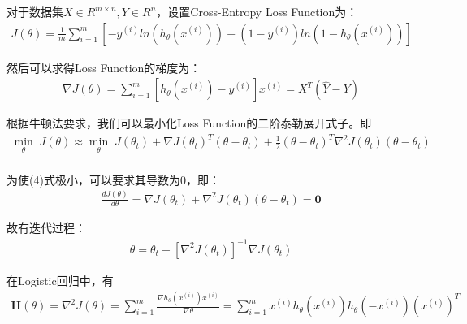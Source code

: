 \documentclass{article}
\begin{document}
对于数据集$X\in R^{m\times n}, Y\in R^{n}$，设置Cross-Entropy Loss Function为：
\begin{equation}
    \begin{split}
        J(\theta)=\frac{1}{m}\sum_{i=1}^m[-y^{(i)}ln(h_\theta(x^{(i)}))-(1-y^{(i)})ln(1-h_\theta(x^{(i)}))]        
    \end{split}
\end{equation}

然后可以求得Loss Function的梯度为：
\begin{equation}
    \begin{split}
        \nabla J(\theta)=\sum_{i=1}^m[h_\theta(x^{(i)})-y^{(i)}]x^{(i)}=X^T(\hat{Y}-Y)
    \end{split}
\end{equation}

根据牛顿法要求，我们可以最小化Loss Function的二阶泰勒展开式子。即
\begin{equation}
    \begin{split}
        \min_\theta\;J(\theta)\approx \min_\theta\;J(\theta_t)+\nabla J(\theta_t)^T(\theta-\theta_t)+\frac{1}{2}(\theta-\theta_t)^T\nabla^2J(\theta_t)(\theta-\theta_t)\\
    \end{split}
\end{equation}

为使(4)式极小，可以要求其导数为0，即：
\begin{equation}
    \begin{split}
        \frac{dJ(\theta)}{d\theta}=\nabla J(\theta_t)+\nabla^2J(\theta_t)(\theta-\theta_t)=\textbf{0}
    \end{split}
\end{equation}

故有迭代过程：
\begin{equation}
    \begin{split}
        \theta=\theta_t-[\nabla^2J(\theta_t)]^{-1}\nabla J(\theta_t)
    \end{split}
\end{equation}

在Logistic回归中，有
\begin{equation}
    \begin{split}
        \textbf{H}(\theta)=\nabla^2 J(\theta)=\sum_{i=1}^m\frac{\nabla h_\theta(x^{(i)})x^{(i)}}{\nabla \theta}
            =\sum_{i=1}^mx^{(i)}h_\theta(x^{(i)})h_\theta(-x^{(i)})(x^{(i)})^T
    \end{split}
\end{equation}
\end{document}
